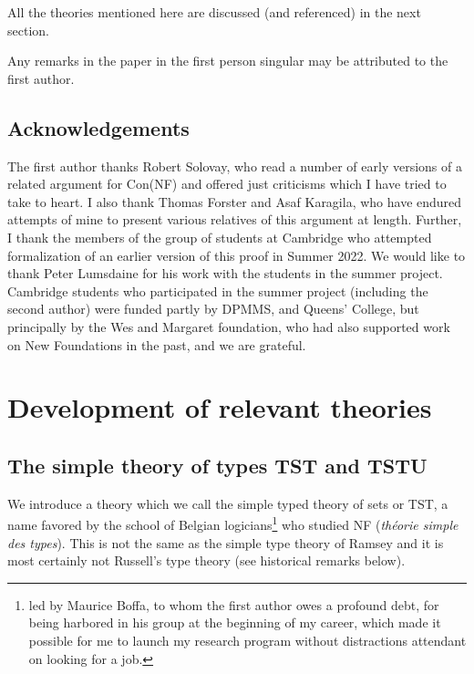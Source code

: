 \documentclass{article}
\theoremstyle{definition}
\theoremstyle{remark}
\begin{document}
All the theories mentioned here are discussed (and referenced) in the next section.

Any remarks in the paper in the first person singular may be attributed to the first author.

\subsection{Acknowledgements}

The first author thanks Robert Solovay, who read a number of early versions of a related argument for Con(NF) and offered just criticisms which I have tried to take to heart.  I also thank Thomas Forster and Asaf Karagila, who have endured attempts of mine to present various relatives of this argument at length.  Further, I thank the members of the group of students at Cambridge who attempted formalization of an earlier version of this proof in Summer 2022.  We would like to thank Peter Lumsdaine for his work with the students in the summer project.   Cambridge students who participated in the summer project (including the second author) were funded partly by DPMMS, and Queens' College, but principally by the Wes and Margaret foundation, who had also supported work on New Foundations in the past, and we are grateful.



\newpage

\section{Development of relevant theories}



\subsection{The simple theory of types TST and TSTU}

We introduce a theory which we call the simple typed theory of sets or TST, a name favored by the school of Belgian logicians\footnote{led by Maurice Boffa, to whom the first author owes a profound debt, for being harbored in his group at the beginning of my career, which made it possible for me to launch my research program without distractions attendant on looking for a job.} who studied NF ({\em th\'eorie simple des types}).  This is not the same as the simple type theory of Ramsey and it is most certainly not Russell's type theory  (see historical remarks below).
\end{document}
